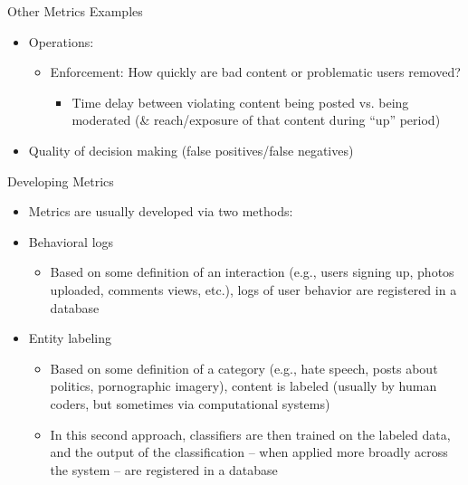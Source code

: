 \documentclass[nobackground,dvipsnames,table]{beamer}
\begin{document}
\begin{frame}{Other Metrics Examples}
\begin{itemize}
    \item Operations:

    \begin{itemize}
        \item Enforcement: How quickly are bad content or problematic users removed?

        \begin{itemize}
            \item Time delay between violating content being posted vs. being moderated (\& reach/exposure of that content during “up” period)
        \end{itemize}
    \end{itemize}
    
    \item Quality of decision making (false positives/false negatives)
\end{itemize}
\end{frame}


\begin{frame}{Developing Metrics}

\begin{itemize}
    \item Metrics are usually developed via two methods:
    \item Behavioral logs

    \begin{itemize}
        \item Based on some definition of an interaction (e.g., users signing up, photos uploaded, comments views, etc.), logs of user behavior are registered in a database
    \end{itemize}

    \item Entity labeling

    \begin{itemize}
        \item Based on some definition of a category (e.g., hate speech, posts about politics, pornographic imagery), content is labeled (usually by human coders, but sometimes via computational systems)
        \item In this second approach, classifiers are then trained on the labeled data, and the output of the classification – when applied more broadly across the system – are registered in a database
    \end{itemize}
\end{itemize}

\end{frame}
\end{document}
